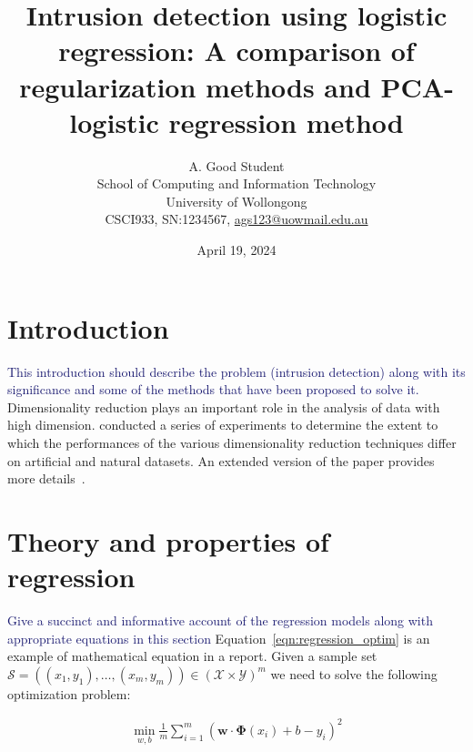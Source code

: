 \documentclass[a4paper,10pt,twocolumn]{article}
\title{Intrusion detection using logistic regression: A comparison of regularization methods and PCA-logistic regression method}
\author{A. Good Student \\
        School of Computing and Information Technology\\
        University of Wollongong\\
        CSCI933, SN:1234567, \url{ags123@uowmail.edu.au}}
\date{April 19, 2024}
\newcommand{\mbold}[1]{\boldsymbol{#1}}
\newcommand{\hilight}[2][MidnightBlue]{\textcolor{#1}{#2}}
\begin{document}
\onehalfspacing
{}


\section{Introduction}
\label{sec:introduction}
\hilight{This introduction should describe the problem (intrusion detection) along with its significance and some of the methods that have been proposed to solve it. }
Dimensionality reduction plays an important role in the analysis of data with high dimension. \cite{maaten2008} conducted a series of experiments to determine the extent to which the performances of the various dimensionality reduction techniques differ on artificial and natural datasets. An extended version of the paper provides more details~\citep{maaten2009}.
\lipsum[2]

\section{Theory and properties of regression}
\hilight{Give a succinct and informative account of the regression models along with appropriate equations in this section}
Equation~\ref{eqn:regression_optim} is an example of mathematical equation in a report.
Given a sample set $ \mathcal{S} = ((x_1, y_1), \ldots, (x_m, y_m) ) \in 
(\mathcal{X} \times \mathcal{Y})^m$
we need to solve the following optimization problem:

\begin{align}
 \label{eqn:regression_optim}
     \min_{w,b} \frac{1}{m} \sum_{i=1}^m
 (\mathbf{w} \cdot \mbold{\Phi}(x_i) + b - y_i)^2
\end{align}
\end{document}
